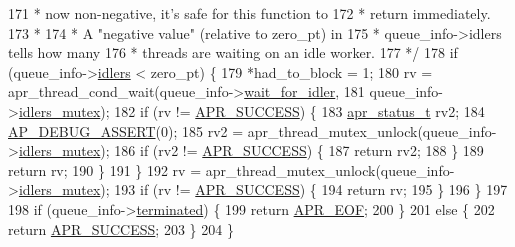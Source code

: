 \begin{DoxyCode}
171 \textcolor{comment}{         *     now non-negative, it's safe for this function to}
172 \textcolor{comment}{         *     return immediately.}
173 \textcolor{comment}{         *}
174 \textcolor{comment}{         *     A "negative value" (relative to zero\_pt) in}
175 \textcolor{comment}{         *     queue\_info->idlers tells how many}
176 \textcolor{comment}{         *     threads are waiting on an idle worker.}
177 \textcolor{comment}{         */}
178         \textcolor{keywordflow}{if} (queue\_info->\hyperlink{structfd__queue__info__t_a34f88b2125fb629dd4200cf75568bb1d}{idlers} < zero\_pt) \{
179             *had\_to\_block = 1;
180             rv = apr\_thread\_cond\_wait(queue\_info->\hyperlink{structfd__queue__info__t_ab55cf55999e66ef49df240ec7ac1b750}{wait\_for\_idler},
181                                       queue\_info->\hyperlink{structfd__queue__info__t_a18d58b9d46ec7629daee1c309161b8d0}{idlers\_mutex});
182             \textcolor{keywordflow}{if} (rv != \hyperlink{group__apr__errno_ga9ee311b7bf1c691dc521d721339ee2a6}{APR\_SUCCESS}) \{
183                 \hyperlink{group__apr__errno_gaa5105fa83cc322f09382292db8b47593}{apr\_status\_t} rv2;
184                 \hyperlink{group__APACHE__CORE__DAEMON_ga85dbc1e4d9600422461f815193f8ace8}{AP\_DEBUG\_ASSERT}(0);
185                 rv2 = apr\_thread\_mutex\_unlock(queue\_info->\hyperlink{structfd__queue__info__t_a18d58b9d46ec7629daee1c309161b8d0}{idlers\_mutex});
186                 \textcolor{keywordflow}{if} (rv2 != \hyperlink{group__apr__errno_ga9ee311b7bf1c691dc521d721339ee2a6}{APR\_SUCCESS}) \{
187                     \textcolor{keywordflow}{return} rv2;
188                 \}
189                 \textcolor{keywordflow}{return} rv;
190             \}
191         \}
192         rv = apr\_thread\_mutex\_unlock(queue\_info->\hyperlink{structfd__queue__info__t_a18d58b9d46ec7629daee1c309161b8d0}{idlers\_mutex});
193         \textcolor{keywordflow}{if} (rv != \hyperlink{group__apr__errno_ga9ee311b7bf1c691dc521d721339ee2a6}{APR\_SUCCESS}) \{
194             \textcolor{keywordflow}{return} rv;
195         \}
196     \}
197 
198     \textcolor{keywordflow}{if} (queue\_info->\hyperlink{structfd__queue__info__t_ab3c2c38658e83a417f7d6d98ed021d87}{terminated}) \{
199         \textcolor{keywordflow}{return} \hyperlink{group__APR__Error_ga35d9dca2514c522a2840aca0f3e2ebd3}{APR\_EOF};
200     \}
201     \textcolor{keywordflow}{else} \{
202         \textcolor{keywordflow}{return} \hyperlink{group__apr__errno_ga9ee311b7bf1c691dc521d721339ee2a6}{APR\_SUCCESS};
203     \}
204 \}
\end{DoxyCode}


